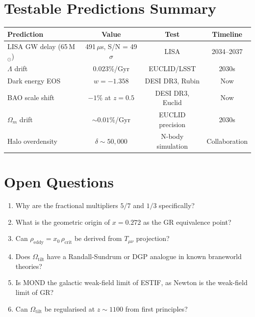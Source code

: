 \documentclass[12pt]{article}
\begin{document}
\section{Testable Predictions Summary}

\begin{center}
\begin{tabular}{lccc}
\toprule
Prediction & Value & Test & Timeline \\
\midrule
LISA GW delay (65\,M$_\odot$) & 491\,$\mu$s, S/N = 49$\sigma$ & LISA & 2034--2037 \\
$\Lambda$ drift & $0.023\%$/Gyr & EUCLID/LSST & 2030s \\
Dark energy EOS & $w = −1.358$ & DESI DR3, Rubin & Now \\
BAO scale shift & $-1\%$ at $z=0.5$ & DESI DR3, Euclid & Now \\
$\Omega_m$ drift & $\sim 0.01\%$/Gyr & EUCLID precision & 2030s \\
Halo overdensity & $\delta \sim 50{,}000$ & N-body simulation & Collaboration \\
\bottomrule
\end{tabular}
\end{center}

\section{Open Questions}

\begin{enumerate}
\item Why are the fractional multipliers $5/7$ and $1/3$ specifically?
\item What is the geometric origin of $x = 0.272$ as the GR equivalence point?
\item Can $\rho_\text{eddy} = x_0\,\rho_\text{crit}$ be derived from $T_{\mu\nu}$ projection?
\item Does $\Omega_\text{tilt}$ have a Randall-Sundrum or DGP analogue in known braneworld theories?
\item Is MOND the galactic weak-field limit of ESTIF, as Newton is the weak-field limit of GR?
\item Can $\Omega_\text{tilt}$ be regularised at $z \sim 1100$ from first principles?
\end{enumerate}

\end{document}
